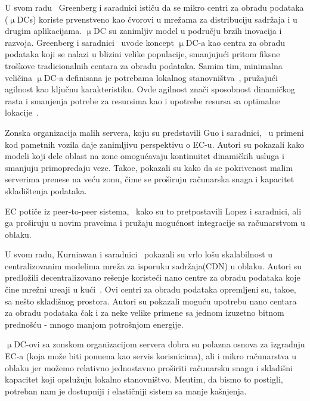 U svom radu~\cite{GreenbergHMP09} Greenberg i saradnici isti\v cu da se mikro centri za obradu podataka ($\upmu$DCs) koriste prvenstveno kao \v cvorovi u mre\v zama za distribuciju sadr\v zaja i u drugim  aplikacijama. $\upmu$DC su zanimljiv model u podru\v cju brzih inovacija i razvoja. Greenberg i saradnici~\cite{GreenbergHMP09} uvode koncept $\upmu$DC-a kao centra za obradu podataka koji se nalazi u blizini velike populacije, smanjuju\'ci pritom fiksne tro\v skove tradicionalnih centara za obradu podataka. Samim tim, minimalna veli\v cina $\upmu$DC-a definisana je potrebama lokalnog stanovni\v stva~\cite{GreenbergHMP09, AbbasZTS18}, pru\v zaju\'ci agilnost kao klju\v cnu karakteristiku. Ovde agilnost zna\v ci sposobnost dinami\v ckog rasta i smanjenja potrebe za resursima kao i upotrebe resursa sa optimalne lokacije~\cite{GreenbergHMP09}. 

Zonska organizacija malih servera, koju su predstavili Guo i saradnici,~\cite{GuoRG20} u primeni kod pametnih vozila daje zanimljivu perspektivu o EC-u. Autori su pokazali kako modeli koji dele oblast na zone omogu\'cavaju kontinuitet dinami\v ckih usluga i smanjuju primopredaju veze. Tako\dj e, pokazali su kako da se pokrivenost malim serverima prenese na ve\'cu zonu, \v cime se pro\v siruju ra\v cunarska snaga i kapacitet skladi\v stenja podataka.

EC poti\v ce iz peer-to-peer sistema,~\cite{LopezMEDHIBFR15} kako su to pretpostavili Lopez i saradnici, ali ga pro\v siruju u novim pravcima i pru\v zaju mogu\'cnost integracije sa ra\v cunarstvom u oblaku.

U svom radu, Kurniawan i saradnici~\cite{inbookKurniawan} pokazali su vrlo lo\v su skalabilnost u centralizovanim modelima mre\v za za isporuku sadr\v zaja(CDN) u oblaku. Autori su predlo\v zili decentralizovano re\v senje koriste\'ci nano centre za obradu podataka koje \v cine mre\v zni ure\dj aji u ku\'ci~\cite{inbookKurniawan}. Ovi centri za obradu podataka opremljeni su, tako\dj e, sa ne\v sto skladi\v snog prostora. Autori su pokazali mogu\'cu upotrebu nano centara za obradu podataka \v cak i za neke velike primene sa jednom izuzetno bitnom predno\v s\'cu - mnogo manjom potro\v snjom energije.

$\upmu$DC-ovi sa zonskom organizacijom servera dobra su polazna osnova za izgradnju EC-a (koja mo\v ze biti ponu\dj ena kao servis korisnicima), ali i mikro ra\v cunarstva u oblaku jer mo\v zemo relativno jednostavno pro\v siriti ra\v cunarsku snagu i skladi\v sni kapacitet koji opslu\v zuju lokalno stanovni\v stvo. Me\dj utim, da bismo to postigli, potreban nam je dostupniji i elasti\v cniji sistem sa manje ka\v snjenja. 


